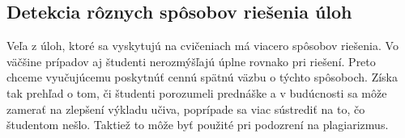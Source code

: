 \subsection{Detekcia rôznych spôsobov riešenia úloh}
\label{sec:apprequirements:similarsolutions}

Veľa z úloh, ktoré sa vyskytujú na cvičeniach má viacero spôsobov riešenia. Vo väčšine
prípadov aj študenti nerozmýšľajú úplne rovnako pri riešení. Preto chceme vyučujúcemu
poskytnúť cennú spätnú väzbu o týchto spôsoboch. Získa tak prehľad
o tom, či študenti porozumeli prednáške a v budúcnosti sa môže zamerať na zlepšení
výkladu učiva, poprípade sa viac sústrediť na to, čo študentom nešlo. Taktiež
to môže byť použité pri podozrení na plagiarizmus.